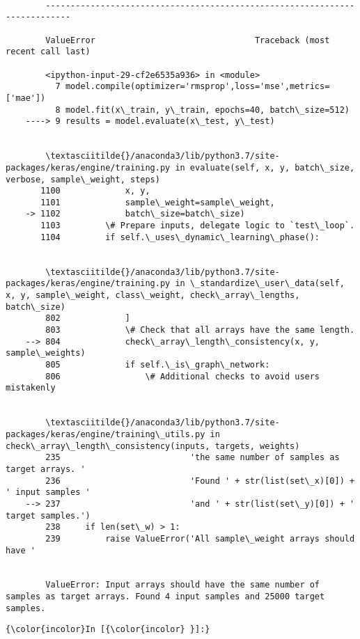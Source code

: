 \documentclass[11pt]{article}
\begin{document}
    \begin{Verbatim}[commandchars=\\\{\}]

        ---------------------------------------------------------------------------

        ValueError                                Traceback (most recent call last)

        <ipython-input-29-cf2e6535a936> in <module>
          7 model.compile(optimizer='rmsprop',loss='mse',metrics=['mae'])
          8 model.fit(x\_train, y\_train, epochs=40, batch\_size=512)
    ----> 9 results = model.evaluate(x\_test, y\_test)
    

        \textasciitilde{}/anaconda3/lib/python3.7/site-packages/keras/engine/training.py in evaluate(self, x, y, batch\_size, verbose, sample\_weight, steps)
       1100             x, y,
       1101             sample\_weight=sample\_weight,
    -> 1102             batch\_size=batch\_size)
       1103         \# Prepare inputs, delegate logic to `test\_loop`.
       1104         if self.\_uses\_dynamic\_learning\_phase():


        \textasciitilde{}/anaconda3/lib/python3.7/site-packages/keras/engine/training.py in \_standardize\_user\_data(self, x, y, sample\_weight, class\_weight, check\_array\_lengths, batch\_size)
        802             ]
        803             \# Check that all arrays have the same length.
    --> 804             check\_array\_length\_consistency(x, y, sample\_weights)
        805             if self.\_is\_graph\_network:
        806                 \# Additional checks to avoid users mistakenly


        \textasciitilde{}/anaconda3/lib/python3.7/site-packages/keras/engine/training\_utils.py in check\_array\_length\_consistency(inputs, targets, weights)
        235                          'the same number of samples as target arrays. '
        236                          'Found ' + str(list(set\_x)[0]) + ' input samples '
    --> 237                          'and ' + str(list(set\_y)[0]) + ' target samples.')
        238     if len(set\_w) > 1:
        239         raise ValueError('All sample\_weight arrays should have '


        ValueError: Input arrays should have the same number of samples as target arrays. Found 4 input samples and 25000 target samples.

    \end{Verbatim}

    \begin{Verbatim}[commandchars=\\\{\}]
{\color{incolor}In [{\color{incolor} }]:} 
\end{Verbatim}


    
    
    
    
\end{document}
